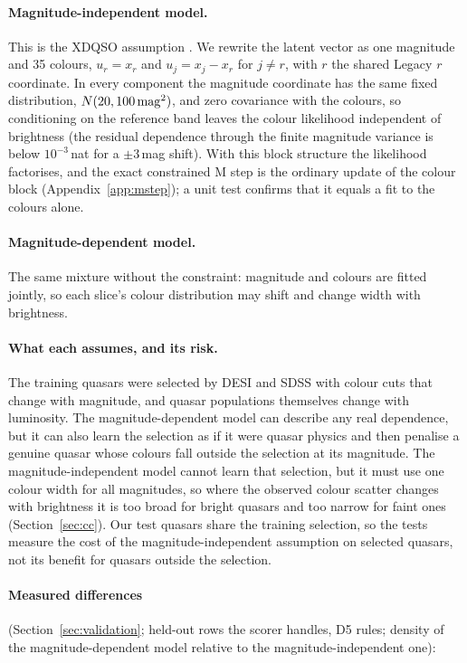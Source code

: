 \documentclass[11pt,a4paper]{article}
\begin{document}
\paragraph{Magnitude-independent model.} This is the XDQSO assumption \citep{Bovy2011XDQSO}. We rewrite the
latent vector as one magnitude and 35 colours, $u_r=x_r$ and $u_j=x_j-x_r$ for $j\neq r$, with $r$ the
shared Legacy $r$ coordinate. In every component the magnitude coordinate has the same fixed distribution,
$N(20,100\,{\rm mag}^2)$, and zero covariance with the colours, so conditioning on the reference band leaves
the colour likelihood independent of brightness (the residual dependence through the finite magnitude
variance is below $10^{-3}$\,nat for a $\pm3$\,mag shift). With this block structure the likelihood
factorises, and the exact constrained M step is the ordinary update of the colour block
(Appendix~\ref{app:mstep}); a unit test confirms that it equals a fit to the colours alone.

\paragraph{Magnitude-dependent model.} The same mixture without the constraint: magnitude and colours are
fitted jointly, so each slice's colour distribution may shift and change width with brightness.

\paragraph{What each assumes, and its risk.} The training quasars were selected by DESI and SDSS with colour
cuts that change with magnitude, and quasar populations themselves change with luminosity. The
magnitude-dependent model can describe any real dependence, but it can also learn the selection as if it
were quasar physics and then penalise a genuine quasar whose colours fall outside the selection at its
magnitude. The magnitude-independent model cannot learn that selection, but it must use one colour width
for all magnitudes, so where the observed colour scatter changes with brightness it is too broad for
bright quasars and too narrow for faint ones (Section~\ref{sec:cc}). Our test quasars share the training
selection, so the tests measure the cost of the magnitude-independent assumption on selected quasars,
not its benefit for quasars outside the selection.

\paragraph{Measured differences} (Section~\ref{sec:validation}; held-out rows the scorer handles, D5 rules; density
of the magnitude-dependent model relative to the magnitude-independent one):
\end{document}
